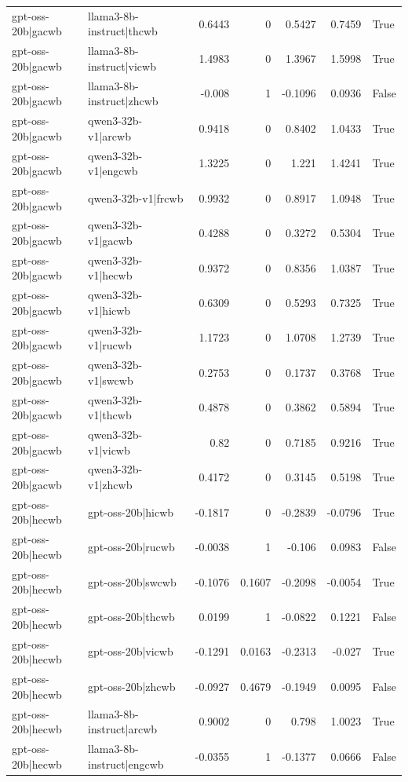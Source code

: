 \begin{table}
\begin{tabular}{l l r r r r l}
gpt-oss-20b|gacwb & llama3-8b-instruct|thcwb & 0.6443 & 0 & 0.5427 & 0.7459 & True \\
gpt-oss-20b|gacwb & llama3-8b-instruct|vicwb & 1.4983 & 0 & 1.3967 & 1.5998 & True \\
gpt-oss-20b|gacwb & llama3-8b-instruct|zhcwb & -0.008 & 1 & -0.1096 & 0.0936 & False \\
gpt-oss-20b|gacwb & qwen3-32b-v1|arcwb & 0.9418 & 0 & 0.8402 & 1.0433 & True \\
gpt-oss-20b|gacwb & qwen3-32b-v1|engcwb & 1.3225 & 0 & 1.221 & 1.4241 & True \\
gpt-oss-20b|gacwb & qwen3-32b-v1|frcwb & 0.9932 & 0 & 0.8917 & 1.0948 & True \\
gpt-oss-20b|gacwb & qwen3-32b-v1|gacwb & 0.4288 & 0 & 0.3272 & 0.5304 & True \\
gpt-oss-20b|gacwb & qwen3-32b-v1|hecwb & 0.9372 & 0 & 0.8356 & 1.0387 & True \\
gpt-oss-20b|gacwb & qwen3-32b-v1|hicwb & 0.6309 & 0 & 0.5293 & 0.7325 & True \\
gpt-oss-20b|gacwb & qwen3-32b-v1|rucwb & 1.1723 & 0 & 1.0708 & 1.2739 & True \\
gpt-oss-20b|gacwb & qwen3-32b-v1|swcwb & 0.2753 & 0 & 0.1737 & 0.3768 & True \\
gpt-oss-20b|gacwb & qwen3-32b-v1|thcwb & 0.4878 & 0 & 0.3862 & 0.5894 & True \\
gpt-oss-20b|gacwb & qwen3-32b-v1|vicwb & 0.82 & 0 & 0.7185 & 0.9216 & True \\
gpt-oss-20b|gacwb & qwen3-32b-v1|zhcwb & 0.4172 & 0 & 0.3145 & 0.5198 & True \\
gpt-oss-20b|hecwb & gpt-oss-20b|hicwb & -0.1817 & 0 & -0.2839 & -0.0796 & True \\
gpt-oss-20b|hecwb & gpt-oss-20b|rucwb & -0.0038 & 1 & -0.106 & 0.0983 & False \\
gpt-oss-20b|hecwb & gpt-oss-20b|swcwb & -0.1076 & 0.1607 & -0.2098 & -0.0054 & True \\
gpt-oss-20b|hecwb & gpt-oss-20b|thcwb & 0.0199 & 1 & -0.0822 & 0.1221 & False \\
gpt-oss-20b|hecwb & gpt-oss-20b|vicwb & -0.1291 & 0.0163 & -0.2313 & -0.027 & True \\
gpt-oss-20b|hecwb & gpt-oss-20b|zhcwb & -0.0927 & 0.4679 & -0.1949 & 0.0095 & False \\
gpt-oss-20b|hecwb & llama3-8b-instruct|arcwb & 0.9002 & 0 & 0.798 & 1.0023 & True \\
gpt-oss-20b|hecwb & llama3-8b-instruct|engcwb & -0.0355 & 1 & -0.1377 & 0.0666 & False \\

\end{tabular}
\end{table}
